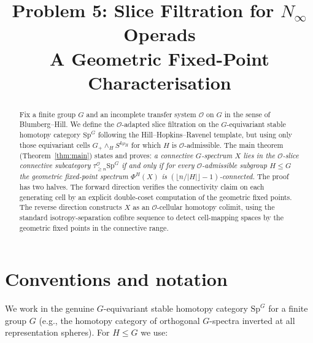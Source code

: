 \documentclass[12pt]{article}
\title{Problem 5: Slice Filtration for $N_\infty$ Operads\\
A Geometric Fixed-Point Characterisation}
\author{}
\date{}
\theoremstyle{definition}
\newcommand{\SpG}{\mathrm{Sp}^{G}}
\newcommand{\PhiH}{\Phi^{H}}
\newcommand{\OO}{\mathcal{O}}
\begin{document}
\maketitle

\begin{abstract}
Fix a finite group $G$ and an incomplete transfer system $\OO$ on $G$ in the
sense of Blumberg--Hill. We define the $\OO$-adapted slice filtration on the
$G$-equivariant stable homotopy category $\SpG$ following the
Hill--Hopkins--Ravenel template, but using only those equivariant cells
$G_{+}\wedge_{H}S^{k\rho_{H}}$ for which $H$ is $\OO$-admissible. The main
theorem (Theorem~\ref{thm:main}) states and proves: \emph{a connective $G$-spectrum
$X$ lies in the $\OO$-slice connective subcategory $\tau_{\geq n}^{\OO}\SpG$
if and only if for every $\OO$-admissible subgroup $H\leq G$ the geometric
fixed-point spectrum $\PhiH(X)$ is $(\lfloor n/|H|\rfloor-1)$-connected.}
The proof has two halves. The forward direction verifies the connectivity
claim on each generating cell by an explicit double-coset computation of the
geometric fixed points. The reverse direction constructs $X$ as an
$\OO$-cellular homotopy colimit, using the standard isotropy-separation
cofibre sequence to detect cell-mapping spaces by the geometric fixed points
in the connective range.
\end{abstract}

\tableofcontents
\bigskip

\section{Conventions and notation}

We work in the genuine $G$-equivariant stable homotopy category $\SpG$ for a
finite group $G$ (e.g., the homotopy category of orthogonal $G$-spectra
inverted at all representation spheres). For $H\leq G$ we use:
\end{document}
